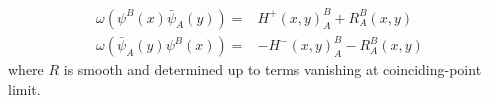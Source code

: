 \begin{equation}\label{intro-renormalization}
\begin{split}
\omega(\psi^B(x)\bar{\psi}_A(y)) = & H^+(x,y)^B_A + R^B_A(x,y) \\
\omega(\bar{\psi}_A(y)\psi^B(x)) = &- H^-(x,y)^B_A - R^B_A(x,y)
\end{split}
\end{equation}
where $R$ is smooth and determined up to terms vanishing at coinciding-point limit. 
%
%
%
%















